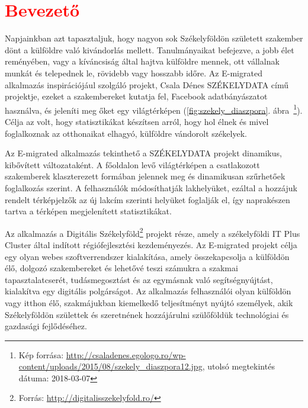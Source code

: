 \chapter*{\textcolor{red}{Bevezető}}

Napjainkban azt tapasztaljuk, hogy nagyon sok Székelyföldön született szakember dönt a külföldre való kivándorlás mellett. Tanulmányaikat befejezve, a jobb élet reményében, vagy a kíváncsiság által hajtva külföldre mennek, ott vállalnak munkát és telepednek le, rövidebb vagy hosszabb időre. Az E-migrated alkalmazás inspirációjául szolgáló projekt, Csala Dénes SZÉKELYDATA című projektje, ezeket a szakembereket kutatja fel, Facebook adatbányászatot használva, és jeleníti meg őket egy világtérképen (\ref{fig:szekely_diaszpora}. ábra~\footnote{Kép forrása: \url{http://csaladenes.egologo.ro/wp-content/uploads/2015/08/szekely_diaszpora12.jpg}, utolsó megtekintés dátuma: 2018-03-07}). Célja az volt, hogy statisztikákat készítsen arról, hogy hol élnek és mivel foglalkoznak az otthonaikat elhagyó, külföldre vándorolt székelyek. 

Az E-migrated alkalmazás tekinthető a SZÉKELYDATA projekt dinamikus, kibővített változataként. A főoldalon levő világtérképen a csatlakozott szakemberek klaszterezett formában jelennek meg és dinamikusan szűrhetőek foglalkozás szerint. A felhasználók módosíthatják lakhelyüket, ezáltal a hozzájuk rendelt térképjelzők az új lakcím szerinti helyüket foglalják el, így naprakészen tartva a térképen  megjelenített statisztikákat. 

Az alkalmazás a Digitális Székelyföld\footnote{Forrás: \url{http://digitalisszekelyfold.ro/}} projekt része, amely  a székelyföldi IT Plus Cluster által indított régiófejlesztési kezdeményezés. Az E-migrated projekt célja egy olyan webes szoftverrendszer kialakítása, amely összekapcsolja a külföldön élő, dolgozó szakembereket és lehetővé teszi számukra a szakmai tapasztalatcserét, tudásmegosztást és az egymásnak való segítségnyújtást, kialakítva egy digitális polgárságot. Az alkalmazás felhasználói olyan külföldön vagy itthon élő, szakmájukban kiemelkedő teljesítményt nyújtó személyek, akik Székelyföldön születtek és szeretnének hozzájárulni szülőföldük technológiai és gazdasági fejlődéséhez. 

